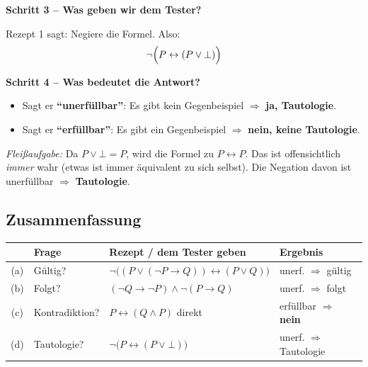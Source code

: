 \documentclass[a4paper,12pt]{article}
\begin{document}
\medskip
\textbf{Schritt 3 -- Was geben wir dem Tester?}

Rezept 1 sagt: Negiere die Formel. Also:
\[
  \neg\Bigl(P \leftrightarrow (P \vee \bot)\Bigr)
\]

\textbf{Schritt 4 -- Was bedeutet die Antwort?}
\begin{itemize}
\item Sagt er \textbf{"`unerf\"ullbar"'}: Es gibt kein Gegenbeispiel
      $\Rightarrow$ \textbf{ja, Tautologie}.
\item Sagt er \textbf{"`erf\"ullbar"'}: Es gibt ein Gegenbeispiel
      $\Rightarrow$ \textbf{nein, keine Tautologie}.
\end{itemize}

\medskip
\textit{Flei\ss aufgabe:} Da $P \vee \bot = P$, wird die Formel zu
$P \leftrightarrow P$. Das ist offensichtlich \emph{immer} wahr
(etwas ist immer \"aquivalent zu sich selbst). Die Negation davon ist
unerf\"ullbar $\Rightarrow$ \textbf{Tautologie}.

\subsection{Zusammenfassung}

\begin{merkbox}[title={Zusammenfassung Aufgabe 3}]
\renewcommand{\arraystretch}{1.4}
\begin{tabular}{c|l|l|l}
 & \textbf{Frage} & \textbf{Rezept / dem Tester geben} & \textbf{Ergebnis} \\
\hline
(a) & G\"ultig? & $\neg\bigl((P \vee (\neg P \to Q)) \leftrightarrow (P \vee Q)\bigr)$
    & unerf. $\Rightarrow$ g\"ultig \\
(b) & Folgt? & $(\neg Q \to \neg P) \wedge \neg(P \to Q)$
    & unerf. $\Rightarrow$ folgt \\
(c) & Kontradiktion? & $P \leftrightarrow (Q \wedge P)$ direkt
    & erf\"ullbar $\Rightarrow$ \textbf{nein} \\
(d) & Tautologie? & $\neg\bigl(P \leftrightarrow (P \vee \bot)\bigr)$
    & unerf. $\Rightarrow$ Tautologie \\
\end{tabular}
\end{merkbox}


\end{document}
